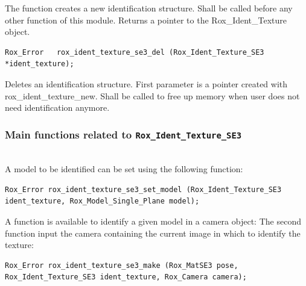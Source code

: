 \noindent The function creates a new identification structure. Shall be called before
any other function of this module. Returns a pointer to the Rox\_Ident\_Texture object. \\

\begin{lstlisting}
Rox_Error 	rox_ident_texture_se3_del (Rox_Ident_Texture_SE3 *ident_texture); 
\end{lstlisting}

\noindent Deletes an identification structure. First parameter is a pointer
created with rox\_ident\_texture\_new. Shall be called to free up memory when
user does not need identification anymore.

\subsubsection{Main functions related to {\tt Rox\_Ident\_Texture\_SE3}}
\label{sss:ident_texture_functions}
~\\

A model to be identified can be set using the following function:
\begin{lstlisting}
Rox_Error rox_ident_texture_se3_set_model (Rox_Ident_Texture_SE3 ident_texture, Rox_Model_Single_Plane model); 
\end{lstlisting}
A function is available to identify a given model in a camera object: 
The second function input the camera containing the current image in which to identify the texture:
\begin{lstlisting}
Rox_Error rox_ident_texture_se3_make (Rox_MatSE3 pose, Rox_Ident_Texture_SE3 ident_texture, Rox_Camera camera);
\end{lstlisting}



